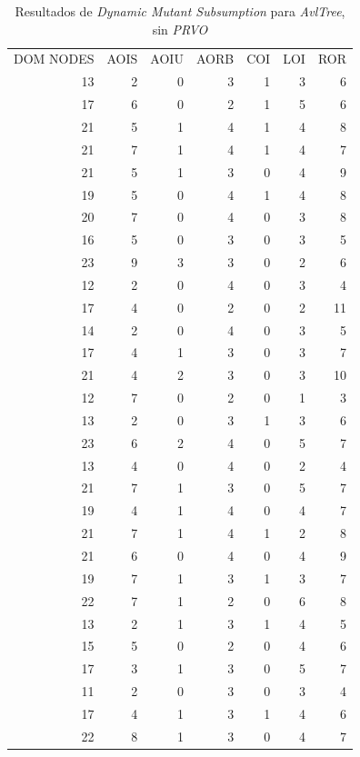 \begin{table}[]
	\caption[\emph{Dynamic Mutant Subsumption} \emph{AvlTree}, sin \emph{PRVO}]{Resultados de \emph{Dynamic Mutant Subsumption} para \emph{AvlTree}, sin \emph{PRVO}}
	\label{tables.results.subsumption.avltree.noprvo}
	\centering
	\scriptsize
	\def\arraystretch{0.95}
	\setlength\tabcolsep{0.5mm}
	\begin{tabular}{rrrrrrr}
		DOM NODES & AOIS & AOIU & AORB & COI & LOI & ROR \\
		13 & 2 & 0 & 3 & 1 & 3 & 6 \\
		17 & 6 & 0 & 2 & 1 & 5 & 6 \\
		21 & 5 & 1 & 4 & 1 & 4 & 8 \\
		21 & 7 & 1 & 4 & 1 & 4 & 7 \\
		21 & 5 & 1 & 3 & 0 & 4 & 9 \\
		19 & 5 & 0 & 4 & 1 & 4 & 8 \\
		20 & 7 & 0 & 4 & 0 & 3 & 8 \\
		16 & 5 & 0 & 3 & 0 & 3 & 5 \\
		23 & 9 & 3 & 3 & 0 & 2 & 6 \\
		12 & 2 & 0 & 4 & 0 & 3 & 4 \\
		17 & 4 & 0 & 2 & 0 & 2 & 11 \\
		14 & 2 & 0 & 4 & 0 & 3 & 5 \\
		17 & 4 & 1 & 3 & 0 & 3 & 7 \\
		21 & 4 & 2 & 3 & 0 & 3 & 10 \\
		12 & 7 & 0 & 2 & 0 & 1 & 3 \\
		13 & 2 & 0 & 3 & 1 & 3 & 6 \\
		23 & 6 & 2 & 4 & 0 & 5 & 7 \\
		13 & 4 & 0 & 4 & 0 & 2 & 4 \\
		21 & 7 & 1 & 3 & 0 & 5 & 7 \\
		19 & 4 & 1 & 4 & 0 & 4 & 7 \\
		21 & 7 & 1 & 4 & 1 & 2 & 8 \\
		21 & 6 & 0 & 4 & 0 & 4 & 9 \\
		19 & 7 & 1 & 3 & 1 & 3 & 7 \\
		22 & 7 & 1 & 2 & 0 & 6 & 8 \\
		13 & 2 & 1 & 3 & 1 & 4 & 5 \\
		15 & 5 & 0 & 2 & 0 & 4 & 6 \\
		17 & 3 & 1 & 3 & 0 & 5 & 7 \\
		11 & 2 & 0 & 3 & 0 & 3 & 4 \\
		17 & 4 & 1 & 3 & 1 & 4 & 6 \\
		22 & 8 & 1 & 3 & 0 & 4 & 7
	\end{tabular}
\end{table}


